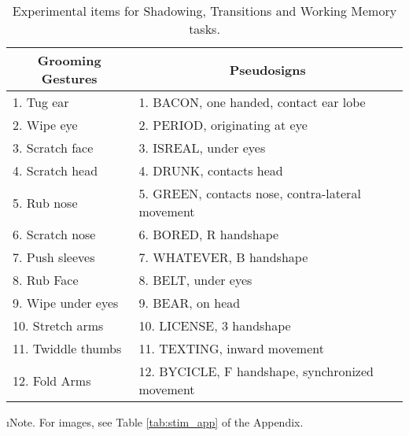 \begin{table}[h] \centering \begin{threeparttable}
    \caption[Experimental items]{Experimental items for Shadowing, Transitions and Working Memory tasks.} \label{tab:stim}
    \begin{tabular}{ll} \hline
    \multicolumn{1}{c}{Grooming Gestures} & \multicolumn{1}{c}{Pseudosigns}\\ \hline
    1.  Tug ear &1.    BACON, one handed, contact ear lobe \\
    2.  Wipe eye &2.    PERIOD, originating at eye \\
    3.  Scratch face &3.    ISREAL, under eyes \\
    4.  Scratch head &4.    DRUNK, contacts head \\
    5.  Rub nose &5.    GREEN, contacts nose, contra-lateral movement \\
    6.  Scratch nose &6.    BORED, R handshape \\
    7.  Push sleeves &7.    WHATEVER, B handshape \\
    8.  Rub Face &8.    BELT, under eyes \\
    9.  Wipe under eyes &9.    BEAR, on head \\
    10. Stretch arms &10.    LICENSE, 3 handshape \\
    11. Twiddle thumbs &11.    TEXTING, inward movement \\
    12. Fold Arms    &12.    BYCICLE, F handshape, synchronized movement \\ \hline \end{tabular} 
    \begin{tablenotes}
        \small \item \i{Note}.
         For images, see Table \ref{tab:stim_app} of the Appendix.
    \end{tablenotes} 
\end{threeparttable}\end{table}   